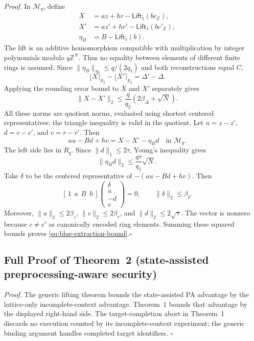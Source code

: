 \documentclass[lettersize,journal]{IEEEtran}
\begin{document}
\emph{Proof.}
In $\mathcal M_q$, define
\[
\begin{aligned}
X&=az+hr-\mathsf{Lift}_1(bc_{\mathbb Z}),\\
X'&=az'+hr'-\mathsf{Lift}_1(bc'_{\mathbb Z}),\\
\eta_B&=B-\mathsf{Lift}_1(b).
\end{aligned}
\]
The lift is an additive homomorphism compatible with multiplication by
integer polynomials modulo $q\mathbb Z^N$. Thus no equality between
elements of different finite rings is assumed. Since
$\|\eta_B\|_\infty\leq q/(2q_1)$ and both reconstructions equal $C$,
\[
\lfloor X\rceil_{p_2}-\lfloor X'\rceil_{p_2}
=\Delta'-\Delta.
\]
Applying the rounding error bound to $X$ and $X'$ separately gives
\[
\|X-X'\|_2
\leq\frac q{q_2}\left(2\beta_\Delta+\sqrt N\right).
\]
All these norms are quotient norms, evaluated using shortest centered
representatives; the triangle inequality is valid in the quotient.
Let $u=z-z'$, $d=c-c'$, and $v=r-r'$. Then
\[
au-Bd+hv=X-X'-\eta_Bd\quad\text{in }\mathcal M_q.
\]
The left side lies in $R_q$. Since $\|d\|_1\leq2\tau$, Young's
inequality gives
\[
\|\eta_Bd\|_2\leq\frac{q\tau}{q_1}\sqrt N.
\]
Take $\delta$ to be the centered representative of $-(au-Bd+hv)$.
Then
\[
[\,1\ \ a\ \ B\ \ h\,]
\begin{pmatrix}\delta\\u\\-d\\v\end{pmatrix}=0,
\qquad \|\delta\|_2\leq\beta_\delta.
\]
Moreover, $\|u\|_2\leq2\beta_z$, $\|v\|_2\leq2\beta_r$, and
$\|d\|_2\leq2\sqrt\tau$. The vector is nonzero because $c\ne c'$
as canonically encoded ring elements. Summing these squared bounds proves
\eqref{eq:blue-extraction-bound}.\hfill$\square$

\subsection{Full Proof of Theorem~2 (state-assisted preprocessing-aware security)}
\label{app:talon-theorem2-proof}

\emph{Proof.}
The generic lifting theorem bounds the
state-assisted PA advantage by the lattice-only incomplete-context
advantage. Theorem~1 bounds that advantage by the displayed
right-hand side. The target-completion abort in Theorem~1 discards no
execution counted by its incomplete-context experiment; the generic
binding argument handles completed target identifiers.
\hfill$\square$
\end{document}
